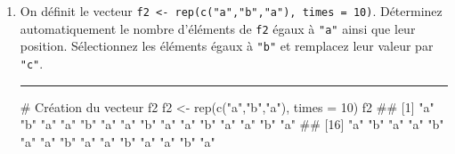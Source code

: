 \documentclass[12pt,twosided, notitlepage]{book}
\newenvironment{Shaded}{}{}
\newcommand{\CommentTok}[1]{\textcolor[rgb]{0.00,0.50,0.00}{#1}}
\newcommand{\DataTypeTok}[1]{#1}
\newcommand{\DecValTok}[1]{#1}
\newcommand{\KeywordTok}[1]{\textcolor[rgb]{0.00,0.00,1.00}{#1}}
\newcommand{\NormalTok}[1]{#1}
\newcommand{\OperatorTok}[1]{#1}
\newcommand{\StringTok}[1]{\textcolor[rgb]{0.00,0.50,0.50}{#1}}
\newif \ifsol
\renewenvironment{Shaded}{\begin{snugshade}}{\end{snugshade}}
\begin{document}
\begin{enumerate}
\begin{Shaded}
\end{Shaded}

  \begin{center} \rule{0.5\linewidth}{\linethickness}\end{center} 
    \bigskip 
    \fi
\item
  On définit le vecteur
  \texttt{f2\ \textless{}-\ rep(c("a","b","a"),\ times\ =\ 10)}.
  Déterminez automatiquement le nombre d'éléments de \texttt{f2} égaux à
  \texttt{"a"} ainsi que leur
  position\index{\texttt{[}}.
  Sélectionnez les éléments égaux à \texttt{"b"} et remplacez leur
  valeur par \texttt{"c"}.

  \ifsol 

  \begin{center} \rule{0.5\linewidth}{\linethickness}\end{center}

\begin{Shaded}
\begin{Highlighting}[]
\CommentTok{# Création du vecteur f2}
\NormalTok{f2 <-}\StringTok{ }\KeywordTok{rep}\NormalTok{(}\KeywordTok{c}\NormalTok{(}\StringTok{"a"}\NormalTok{,}\StringTok{"b"}\NormalTok{,}\StringTok{"a"}\NormalTok{), }\DataTypeTok{times =} \DecValTok{10}\NormalTok{)}
\NormalTok{f2}
\NormalTok{  ##  [1] "a" "b" "a" "a" "b" "a" "a" "b" "a" "a" "b" "a" "a" "b" "a"}
\NormalTok{  ## [16] "a" "b" "a" "a" "b" "a" "a" "b" "a" "a" "b" "a" "a" "b" "a"}


\end{Highlighting}
\end{Shaded}
\end{enumerate}
\end{document}
